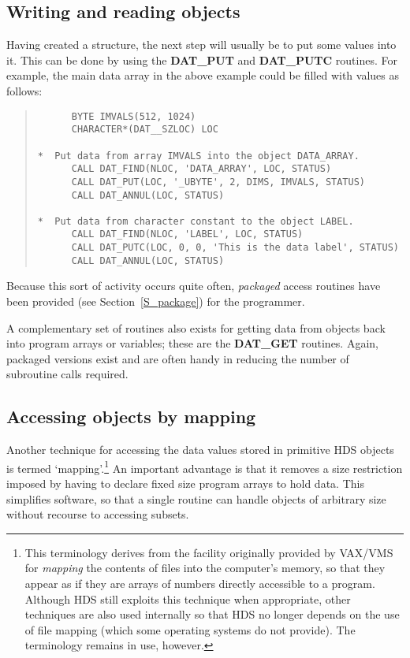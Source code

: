 \subsection{Writing and reading objects}

Having created a structure, the next step will usually be to put some values
into it.
This can be done by using the {\bf DAT\_PUT} and {\bf DAT\_PUTC} routines.
For example, the main data array in the above example could be filled with
values as follows: 

\begin{quote}

\begin{small}
\begin{verbatim}
      BYTE IMVALS(512, 1024)
      CHARACTER*(DAT__SZLOC) LOC

*  Put data from array IMVALS into the object DATA_ARRAY.
      CALL DAT_FIND(NLOC, 'DATA_ARRAY', LOC, STATUS)
      CALL DAT_PUT(LOC, '_UBYTE', 2, DIMS, IMVALS, STATUS)
      CALL DAT_ANNUL(LOC, STATUS)

*  Put data from character constant to the object LABEL.
      CALL DAT_FIND(NLOC, 'LABEL', LOC, STATUS)
      CALL DAT_PUTC(LOC, 0, 0, 'This is the data label', STATUS)
      CALL DAT_ANNUL(LOC, STATUS)
\end{verbatim}
\end{small}

\end{quote}
Because this sort of activity occurs quite often, {\em packaged} access routines
have been provided (see Section~\ref{S_package}) for the programmer.

A complementary set of routines also exists for getting data from objects back
into program arrays or variables; these are the {\bf DAT\_GET} routines.
Again, packaged versions exist and are often handy in reducing the number of
subroutine calls required.

\subsection{Accessing objects by mapping}
\label{S_mapping}

Another technique for accessing the data values stored in primitive HDS objects
is termed `mapping'.\footnote{This terminology derives from the facility
originally provided by VAX/VMS for {\em mapping} the contents of files into the
computer's memory, so that they appear as if they are arrays of numbers
directly accessible to a program.
Although HDS still exploits this technique when appropriate, other techniques
are also used internally so that HDS no longer depends on the use of file
mapping (which some operating systems do not provide).
The terminology remains in use, however.}
An important advantage is that it removes a size restriction imposed by having
to declare fixed size program arrays to hold data.
This simplifies software, so that a single routine can handle objects of
arbitrary size without recourse to accessing subsets. 

